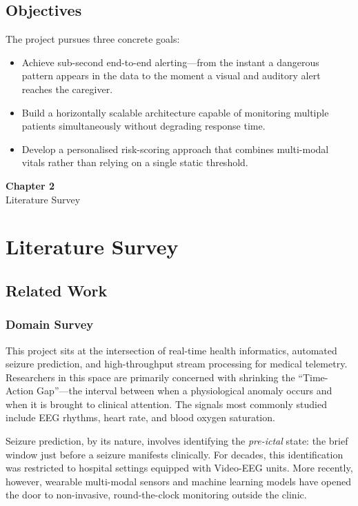 \documentclass[12pt, a4paper, oneside]{report}
\newcommand{\chapterpage}[2]{
    \cleardoublepage
    \thispagestyle{empty}
    \vspace*{\fill}
    \begin{center}
        \huge \textbf{Chapter #1} \\
        \vspace{1cm}
        \Huge #2
    \end{center}
    \vspace*{\fill}
    \newpage
}
\begin{document}
\section{Objectives}
The project pursues three concrete goals:
\begin{itemize}
    \item Achieve sub-second end-to-end alerting---from the instant a dangerous pattern appears in the data to the moment a visual and auditory alert reaches the caregiver.
    \item Build a horizontally scalable architecture capable of monitoring multiple patients simultaneously without degrading response time.
    \item Develop a personalised risk-scoring approach that combines multi-modal vitals rather than relying on a single static threshold.
\end{itemize}


\chapterpage{2}{Literature Survey}
\chapter{Literature Survey}

\section{Related Work}

\subsection{Domain Survey}
This project sits at the intersection of real-time health informatics, automated seizure prediction, and high-throughput stream processing for medical telemetry. Researchers in this space are primarily concerned with shrinking the ``Time-Action Gap''---the interval between when a physiological anomaly occurs and when it is brought to clinical attention. The signals most commonly studied include EEG rhythms, heart rate, and blood oxygen saturation.

Seizure prediction, by its nature, involves identifying the \emph{pre-ictal} state: the brief window just before a seizure manifests clinically. For decades, this identification was restricted to hospital settings equipped with Video-EEG units. More recently, however, wearable multi-modal sensors and machine learning models have opened the door to non-invasive, round-the-clock monitoring outside the clinic.
\end{document}
